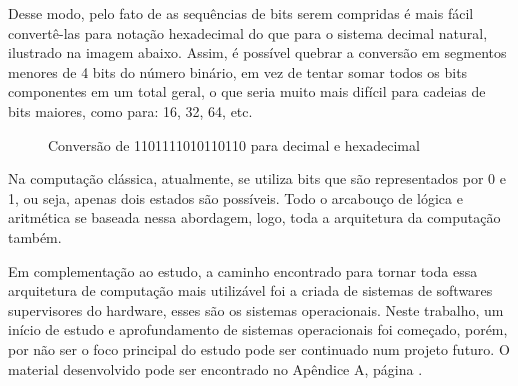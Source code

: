 Desse modo, pelo fato de as sequências de bits serem compridas é mais fácil convertê-las para notação hexadecimal do que para o sistema decimal natural, ilustrado na imagem abaixo. Assim, é possível quebrar a conversão em segmentos menores de 4 bits do número binário, em vez de tentar somar todos os bits componentes em um total geral, o que seria muito mais difícil para cadeias de bits maiores, como para: 16, 32, 64, etc. 

\vspace{1cm}
\begin{figure}[H] \centering 
  \caption{\label{binary_conversions} Conversão de 1101111010110110 para decimal e hexadecimal} 
\end{figure}

Na computação clássica, atualmente, se utiliza bits que são representados por 0 e 1, ou seja, apenas dois estados são possíveis. Todo o arcabouço de lógica e aritmética se baseada nessa abordagem, logo, toda a arquitetura da computação também.

Em complementação ao estudo, a caminho encontrado para tornar toda essa arquitetura de computação mais utilizável foi a criada de sistemas de softwares supervisores do hardware, esses são os sistemas operacionais. Neste trabalho, um início de estudo e aprofundamento de sistemas operacionais foi começado, porém, por não ser o foco principal do estudo pode ser continuado num projeto futuro. O material desenvolvido pode ser encontrado no Apêndice A, página \pageref{apendeceA}.




\newpage
